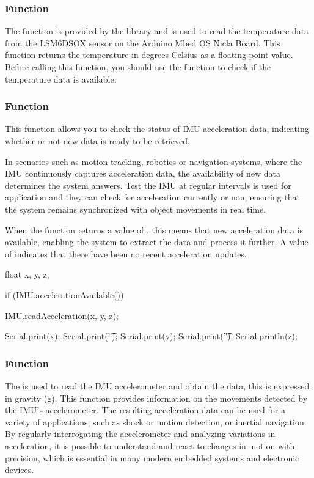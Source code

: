 \subsubsection{Function }

The function is provided by the library  and is used to read the temperature data from the LSM6DSOX sensor on the Arduino Mbed OS Nicla Board. This function returns the temperature in degrees Celsius as a floating-point value. Before calling this function, you should use the function  to check if the temperature data is available.

\subsubsection{Function }
	
This function allows you to check the status of IMU acceleration data, indicating whether or not new data is ready to be retrieved.
	
In scenarios such as motion tracking, robotics or navigation systems, where the IMU continuously captures acceleration data, the availability of new data determines the system answers. Test the IMU at regular intervals is used for application and they can check for acceleration currently or non, ensuring that the system remains synchronized with object movements in real time.
	
When the function returns a value of , this means that new acceleration data is available, enabling the system to extract the data and process it further. A value of  indicates that there have been no recent acceleration updates.
	
\begin{Arduino}
  float x, y, z;
		
  if (IMU.accelerationAvailable()) {
    IMU.readAcceleration(x, y, z);
			
	Serial.print(x);
	Serial.print('\t');
	Serial.print(y);
	Serial.print('\t');
	Serial.println(z); }
\end{Arduino}
	
	

\subsubsection{Function }

The  is used to read the IMU accelerometer and obtain the data, this is expressed in gravity (g). This function provides information on the movements detected by the IMU's accelerometer. The resulting acceleration data can be used for a variety of applications, such as shock or motion detection, or inertial navigation. By regularly interrogating the accelerometer and analyzing variations in acceleration, it is possible to understand and react to changes in motion with precision, which is essential in many modern embedded systems and electronic devices.

